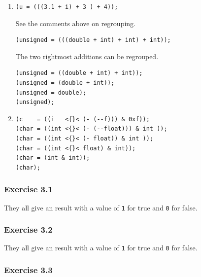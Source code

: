 \begin{enumerate}
    

    \item 
     \begin{Verbatim}
(u = (((3.1 + i) + 3 ) + 4));
\end{Verbatim}

     See the comments above on regrouping.


     \begin{Verbatim}
(unsigned = (((double + int) + int) + int));
\end{Verbatim}

     The two rightmost additions can be regrouped.


     \begin{Verbatim}
(unsigned = ((double + int) + int));
(unsigned = (double + int));
(unsigned = double);
(unsigned);
\end{Verbatim}

    

    \item 
     \begin{Verbatim}
(c    = ((i   <{}< (- (--f))) & 0xf));
(char = ((int <{}< (- (--float))) & int ));
(char = ((int <{}< (- float)) & int ));
(char = ((int <{}< float) & int));
(char = (int & int));
(char);
\end{Verbatim}

    

   \end{enumerate}

  

 

  

  \subsubsection*{Exercise 3.1}

   They all give an \kint{} result with a value of \texttt{1}
    for true and \texttt{0} for false.


  

  \subsubsection*{Exercise 3.2}

   They all give an \kint{} result with a value of \texttt{1}
    for true and \texttt{0} for false.


  

  \subsubsection*{Exercise 3.3}

